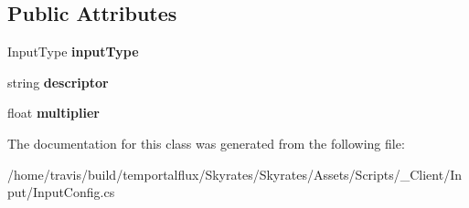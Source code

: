 \subsection*{Public Attributes}
\begin{DoxyCompactItemize}
\item 
\hypertarget{class_input_config_a1cf1efc2bcb1859ec14d174e417b23ef}{Input\-Type {\bfseries input\-Type}}\label{class_input_config_a1cf1efc2bcb1859ec14d174e417b23ef}

\item 
\hypertarget{class_input_config_a7c8f33d4701d02ea34e4cd1aaffccf1f}{string {\bfseries descriptor}}\label{class_input_config_a7c8f33d4701d02ea34e4cd1aaffccf1f}

\item 
\hypertarget{class_input_config_a383612ddc1950d6656f563ae990e6d37}{float {\bfseries multiplier}}\label{class_input_config_a383612ddc1950d6656f563ae990e6d37}

\end{DoxyCompactItemize}


The documentation for this class was generated from the following file\-:\begin{DoxyCompactItemize}
\item 
/home/travis/build/temportalflux/\-Skyrates/\-Skyrates/\-Assets/\-Scripts/\-\_\-\-Client/\-Input/Input\-Config.\-cs\end{DoxyCompactItemize}
